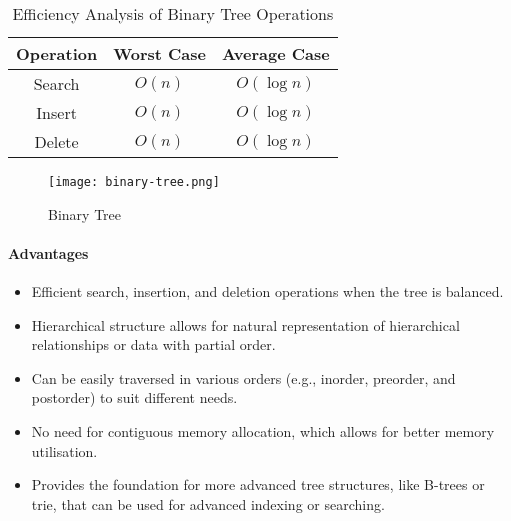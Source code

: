 
\begin{table}[h]
    \centering
    \caption{Efficiency Analysis of Binary Tree Operations}
    \label{tab:binary-tree-efficiency-analysis}
    \begin{tabular}{|c|c|c|}
        \hline
        Operation & Worst Case & Average Case \\ \hline
        Search    & $O(n)$     & $O(\log n)$  \\ \hline
        Insert    & $O(n)$     & $O(\log n)$  \\ \hline
        Delete    & $O(n)$     & $O(\log n)$  \\ \hline
    \end{tabular}
\end{table}
\begin{figure}[!htbp]
    \centering
    \texttt{[image: binary-tree.png]}
    \caption{Binary Tree \cite{mcmahon_2020}}
    \label{fig:binary-tree}
\end{figure}
\newpage

\paragraph{Advantages}
\begin{itemize}
    \item Efficient search, insertion, and deletion operations when the tree is balanced.
    \item Hierarchical structure allows for natural representation of hierarchical relationships or data with partial order.
    \item Can be easily traversed in various orders (e.g., inorder, preorder, and postorder) to suit different needs.
    \item No need for contiguous memory allocation, which allows for better memory utilisation.
    \item Provides the foundation for more advanced tree structures, like B-trees or trie, that can be used for advanced indexing or searching.
\end{itemize}
